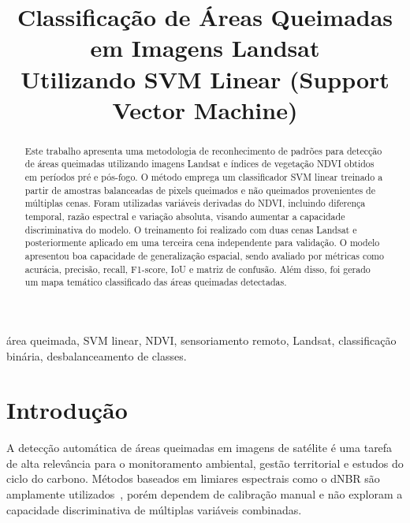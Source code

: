 \documentclass[conference]{IEEEtran}
\begin{document}
\title{Classificação de Áreas Queimadas em Imagens Landsat\\
Utilizando SVM Linear (Support Vector Machine)}

\author{
}

\maketitle

\begin{abstract}
Este trabalho apresenta uma metodologia de reconhecimento de padrões para
detecção de áreas queimadas utilizando imagens Landsat e índices de
vegetação NDVI obtidos em períodos pré e pós-fogo. O método emprega um
classificador SVM linear treinado a partir de amostras balanceadas de pixels
queimados e não queimados provenientes de múltiplas cenas. Foram utilizadas
variáveis derivadas do NDVI, incluindo diferença temporal, razão espectral e
variação absoluta, visando aumentar a capacidade discriminativa do modelo.
O treinamento foi realizado com duas cenas Landsat e posteriormente aplicado
em uma terceira cena independente para validação. O modelo apresentou boa
capacidade de generalização espacial, sendo avaliado por métricas como
acurácia, precisão, recall, F1-score, IoU e matriz de confusão. Além disso,
foi gerado um mapa temático classificado das áreas queimadas detectadas.
\end{abstract}

\begin{IEEEkeywords}
área queimada, SVM linear, NDVI, sensoriamento remoto, Landsat,
classificação binária, desbalanceamento de classes.
\end{IEEEkeywords}

\section{Introdução}

A detecção automática de áreas queimadas em imagens de satélite é uma tarefa
de alta relevância para o monitoramento ambiental, gestão territorial e
estudos do ciclo do carbono. Métodos baseados em limiares espectrais como o
dNBR são amplamente utilizados~\cite{b2}, porém dependem de calibração manual
e não exploram a capacidade discriminativa de múltiplas variáveis combinadas.
\end{document}
